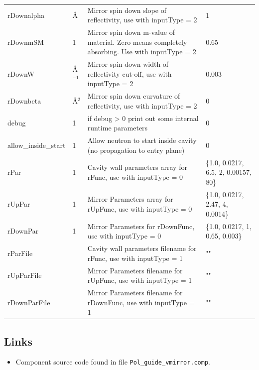 \begin{longtable}{p{}p{}p{}p{}}
rDownalpha & \AA{} & Mirror spin down slope of reflectivity, use with inputType = 2 & 1 \\
rDownmSM & 1 & Mirror spin down m-value of material. Zero means completely absorbing. Use with inputType = 2 & 0.65 \\
rDownW & \AA{}$^{-1}$ & Mirror spin down width of reflectivity cut-off, use with inputType = 2 & 0.003 \\
rDownbeta & \AA{}$^{2}$ & Mirror spin down curvature of reflectivity, use with inputType = 2 & 0 \\
debug & 1 & if debug \textgreater{} 0 print out some internal runtime parameters & 0 \\
allow\_inside\_start & 1 & Allow neutron to start inside cavity (no propagation to entry plane) & 0 \\
rPar & 1 & Cavity wall parameters array for rFunc, use with inputType = 0 & \{1.0, 0.0217, 6.5, 2, 0.00157, 80\} \\
rUpPar & 1 & Mirror Parameters array for rUpFunc, use with inputType = 0 & \{1.0, 0.0217, 2.47, 4, 0.0014\} \\
rDownPar & 1 & Mirror Parameters for rDownFunc, use with inputType = 0 & \{1.0, 0.0217, 1, 0.65, 0.003\} \\
rParFile &  & Cavity wall parameters filename for rFunc, use with inputType = 1 & "" \\
rUpParFile &  & Mirror Parameters filename for rUpFunc, use with inputType = 1 & "" \\
rDownParFile &  & Mirror Parameters filename for rDownFunc, use with inputType = 1 & "" \\
\bottomrule
\end{longtable}

\subsection*{Links}
\begin{itemize}
  \item Component source code found in file \texttt{Pol\_guide\_vmirror.comp}.
\end{itemize}
